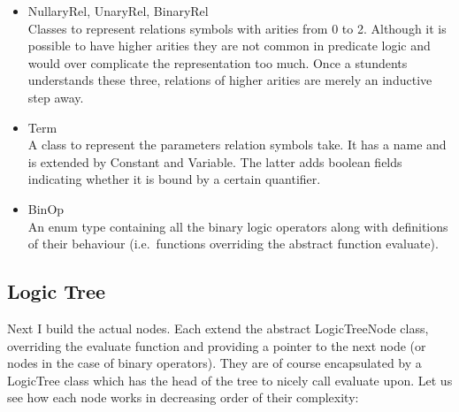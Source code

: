 \documentclass{report}
\begin{document}
\begin{itemize}
\item NullaryRel, UnaryRel, BinaryRel \\
Classes to represent relations symbols with arities from 0 to 2. Although it is possible to have higher arities they are not common in predicate logic and would over complicate the representation too much. Once a stundents understands these three, relations of higher arities are merely an inductive step away.
\item Term \\
A class to represent the parameters relation symbols take. It has a name and is extended by Constant and Variable. The latter adds boolean fields indicating whether it is bound by a certain quantifier. 
\item BinOp \\
An enum type containing all the binary logic operators along with definitions of their behaviour (i.e.\ functions overriding the abstract function evaluate).
\end{itemize}

\subsection{Logic Tree}
Next I build the actual nodes. Each extend the abstract LogicTreeNode class, overriding the evaluate function and providing a pointer to the next node (or nodes in the case of binary operators). They are of course encapsulated by a LogicTree class which has the head of the tree to nicely call evaluate upon. Let us see how each node works in decreasing order of their complexity:
\end{document}
